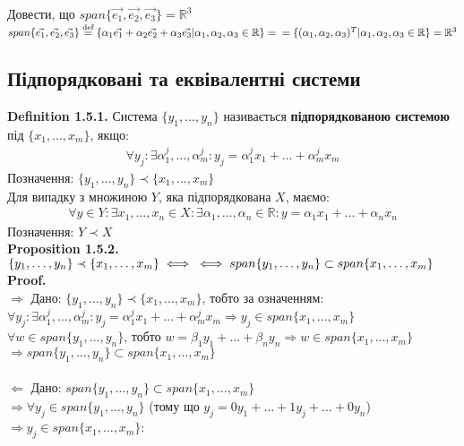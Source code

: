 \documentclass[a4paper, 14pt]{extarticle}
\def\defin#1{\textbf{Definition {#1}}}
\def\prp#1{\textbf{Proposition {#1}}}
\def\proof{\textbf{Proof.}\\}
\def\bigline{\vspace{5mm}\\}
\begin{document}
	Довести, що $span\{\vec{e_1}, \vec{e_2}, \vec{e_3}\} = \mathbb{R}^3$\\
	$span\{\vec{e_1}, \vec{e_2}, \vec{e_3}\} \overset{\textrm{def}}{=} \{\alpha_1 \vec{e_1} + \alpha_2 \vec{e_2} + \alpha_3 \vec{e_3} | \alpha_1, \alpha_2, \alpha_3 \in \mathbb{R}\} = \\ = \{(\alpha_1, \alpha_2, \alpha_3)^T | \alpha_1, \alpha_2, \alpha_3 \in \mathbb{R}\} = \mathbb{R}^3$\\
		
	\subsection{Підпорядковані та еквівалентні системи}
	\defin{1.5.1.} Система $\{y_1, \dots, y_n \}$ називається \textbf{підпорядкованою системою} під $\{x_1, \dots, x_m\}$, якщо:
	\begin{align*}
	\forall y_j: \exists \alpha^j_1, \dots, \alpha^j_m: y_j = \alpha^j_1 x_1 + \dots + \alpha^j_m x_m
	\end{align*}
	Позначення: $\{y_1, \dots, y_n \} \prec \{x_1, \dots, x_m \}$
	\bigline
	Для випадку з множиною $Y$, яка підпорядкована $X$, маємо:
	\begin{align*}
	\forall y \in Y: \exists x_1,\dots,x_n \in X: \exists \alpha_1, \dots, \alpha_n \in \mathbb{R}: y = \alpha_1 x_1 + \dots + \alpha_n x_n
	\end{align*}
	Позначення: $Y \prec X$\bigline
	\prp{1.5.2.} $\{y_1, \dots, y_n \} \prec \{x_1, \dots, x_m \} \iff \\ \iff span \{y_1, \dots, y_n\} \subset span \{x_1, \dots, x_m \}$\\
	\proof
	$\boxed{\Rightarrow}$ Дано: $\{y_1, \dots, y_n \} \prec \{x_1, \dots, x_m \}$, тобто за означенням:\\
	$\forall y_j: \exists \alpha^j_1, \dots, \alpha^j_m: y_j = \alpha^j_1 x_1 + \dots + \alpha^j_m x_m \Rightarrow y_j \in span\{x_1, \dots, x_m\}$\\
	$\forall w \in span\{y_1, \dots, y_n\}$, тобто $w = \beta_1 y_1 + \dots + \beta_n y_n \Rightarrow w \in span\{x_1, \dots, x_m\}$\\
	$\Rightarrow span \{y_1, \dots, y_n\} \subset span \{x_1, \dots, x_m \}$\\
	\\
	$\boxed{\Leftarrow}$ Дано: $span \{y_1, \dots, y_n\} \subset span \{x_1, \dots, x_m \}$\\
	$\Rightarrow \forall y_j \in span \{y_1, \dots, y_n \}$ (тому що $y_j = 0y_1 + \dots + 1 y_j + \dots + 0 y_n$) $\Rightarrow y_j \in span\{x_1,\dots,x_m\}$:\\
\end{document}
